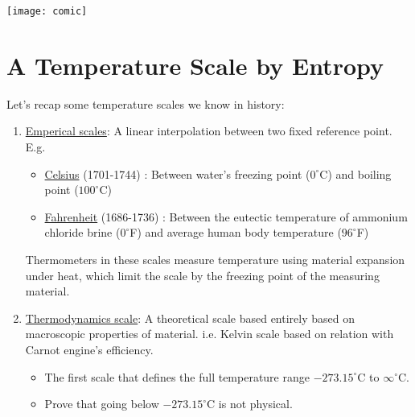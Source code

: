 \documentclass[class=article, crop=false, 12pt]{standalone}
\begin{document}
\begin{center}
    \begin{minipage}{0.4\linewidth}
        \centering
        \texttt{[image: comic]}
    \end{minipage}
\end{center}


\linesep
\section{A Temperature Scale by Entropy}

Let's recap some temperature scales we know in history:
\begin{enumerate}
    \item \ul{Emperical scales}: A linear interpolation between two fixed reference point. E.g.
    \begin{itemize}
        \item \href{https://en.wikipedia.org/wiki/Anders_Celsius}{Celsius} (1701-1744) : 
        Between water's freezing point ($0^\circ$C) and boiling point ($100^\circ$C)

        \item \href{https://en.wikipedia.org/wiki/Daniel_Gabriel_Fahrenheit}{Fahrenheit} (1686-1736) :
        Between the eutectic temperature of ammonium chloride brine ($0^\circ$F) and average human body temperature ($96^\circ$F)
        
    \end{itemize}

    Thermometers in these scales measure temperature using material expansion under heat,
    which limit the scale by the freezing point of the measuring material.

    \item \ul{Thermodynamics scale}: A theoretical scale based entirely based on macroscopic properties of material.
    i.e. Kelvin scale based on relation with Carnot engine's efficiency.

    \begin{itemize}
        \item The first scale that defines the full temperature range $-273.15^\circ$C to $\infty^\circ$C.
        \item Prove that going below $-273.15^\circ$C is not physical.
    \end{itemize}
    
\end{enumerate}
\end{document}
